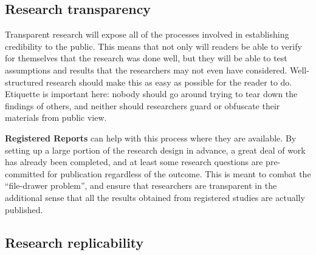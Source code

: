 \subsection{Research transparency}

Transparent research will expose all of the processes involved in establishing credibility to the public.
This means that not only will readers be able to verify for themselves that the research was done well,
but they will be able to test assumptions and results that the researchers may not even have considered.
Well-structured research should make this as easy as possible for the reader to do.
Etiquette is important here: nobody should go around trying to tear down the findings of others,
and neither should researchers guard or obfuscate their materials from public view.

\textbf{Registered Reports} can help with this process where they are available.
By setting up a large portion of the research design in advance,
a great deal of work has already been completed,
and at least some research questions are pre-committed for publication regardless of the outcome.
This is meant to combat the ``file-drawer problem'',\cite{simonsohn2014p}
and ensure that researchers are transparent in the additional sense that
all the results obtained from registered studies are actually published.

\subsection{Research replicability}

